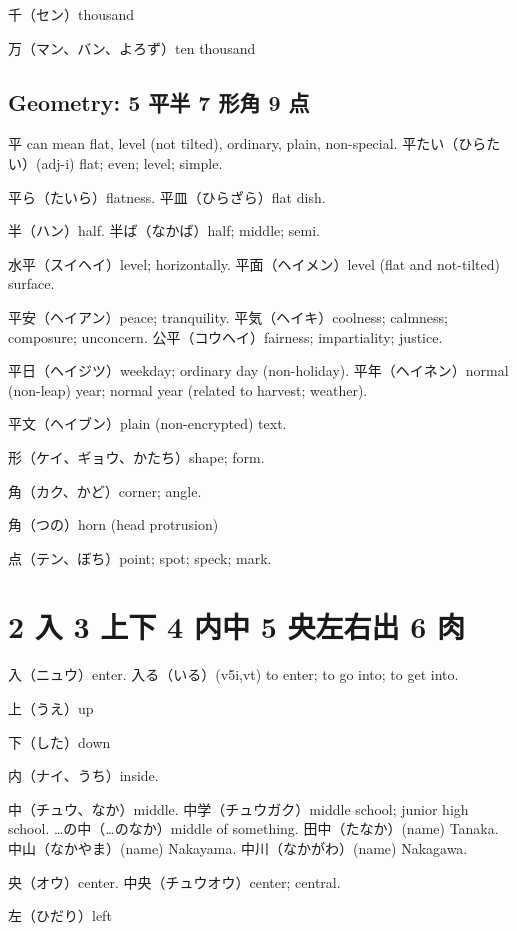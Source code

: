 千（セン）thousand

万（マン、バン、よろず）ten thousand

\subsection{Geometry: 5 平半 7 形角 9 点}

平 can mean flat, level (not tilted), ordinary, plain, non-special.
平たい（ひらたい）(adj-i) flat; even; level; simple.

平ら（たいら）flatness.
平皿（ひらざら）flat dish.

半（ハン）half.
半ば（なかば）half; middle; semi.

水平（スイヘイ）level; horizontally.
平面（ヘイメン）level (flat and not-tilted) surface.

平安（ヘイアン）peace; tranquility.
平気（ヘイキ）coolness; calmness; composure; unconcern.
公平（コウヘイ）fairness; impartiality; justice.

平日（ヘイジツ）weekday; ordinary day (non-holiday).
平年（ヘイネン）normal (non-leap) year; normal year (related to harvest; weather).

平文（ヘイブン）plain (non-encrypted) text.

形（ケイ、ギョウ、かたち）shape; form.

角（カク、かど）corner; angle.

角（つの）horn (head protrusion)

点（テン、ぼち）point; spot; speck; mark.



\section{2 入 3 上下 4 内中 5 央左右出 6 肉}

入（ニュウ）enter.
入る（いる）(v5i,vt)
to enter; to go into; to get into.

上（うえ）up

下（した）down

内（ナイ、うち）inside.

中（チュウ、なか）middle.
中学（チュウガク）middle school; junior high school.
…の中（…のなか）middle of something.
田中（たなか）(name) Tanaka.
中山（なかやま）(name) Nakayama.
中川（なかがわ）(name) Nakagawa.

央（オウ）center.
中央（チュウオウ）center; central.

左（ひだり）left

